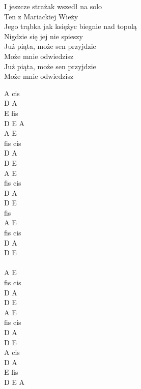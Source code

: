 \documentclass[a5paper, 10pt]{book}
\begin{document}
\begin{minipage}[t]{0.7\textwidth}
  I jeszcze strażak wszedł na solo\\
  Ten z Mariackiej Wieży\\
  Jego trąbka jak księżyc biegnie nad topolą\\
  Nigdzie się jej nie spieszy\\

  \hspace*{4mm} Już piąta, może sen przyjdzie\\
  \hspace*{4mm} Może mnie odwiedzisz\\
  \hspace*{4mm} Już piąta, może sen przyjdzie\\
  \hspace*{4mm} Może mnie odwiedzisz\\

\end{minipage}
\begin{minipage}[t]{0.3\textwidth}
  A cis\\
  D A\\
  E fis\\
  D E A\\

  A E\\
  fis cis\\
  D A\\
  D E\\

  A E\\
  fis cis\\
  D A\\
  D E\\
  fis\\

  A E\\
  fis cis\\
  D A\\
  D E\\

  ~\\

  A E\\
  fis cis\\
  D A\\
  D E\\

  A E\\
  fis cis\\
  D A\\
  D E\\

  A cis \\
  D A \\
  E fis\\
  D E A\\
\end{minipage}
\end{document}
